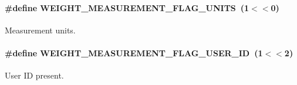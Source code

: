 \paragraph[{\texorpdfstring{W\+E\+I\+G\+H\+T\+\_\+\+M\+E\+A\+S\+U\+R\+E\+M\+E\+N\+T\+\_\+\+F\+L\+A\+G\+\_\+\+U\+N\+I\+TS}{WEIGHT_MEASUREMENT_FLAG_UNITS}}]{\setlength{\rightskip}{0pt plus 5cm}\#define W\+E\+I\+G\+H\+T\+\_\+\+M\+E\+A\+S\+U\+R\+E\+M\+E\+N\+T\+\_\+\+F\+L\+A\+G\+\_\+\+U\+N\+I\+TS~(1$<$$<$0)}\hypertarget{group___w_e_i_g_h_t___m_e_a_s_u_r_e_m_e_n_t___f_l_a_g_gad4a88d51214bde822176b70ce7429fc6}{}\label{group___w_e_i_g_h_t___m_e_a_s_u_r_e_m_e_n_t___f_l_a_g_gad4a88d51214bde822176b70ce7429fc6}
Measurement units. 
\paragraph[{\texorpdfstring{W\+E\+I\+G\+H\+T\+\_\+\+M\+E\+A\+S\+U\+R\+E\+M\+E\+N\+T\+\_\+\+F\+L\+A\+G\+\_\+\+U\+S\+E\+R\+\_\+\+ID}{WEIGHT_MEASUREMENT_FLAG_USER_ID}}]{\setlength{\rightskip}{0pt plus 5cm}\#define W\+E\+I\+G\+H\+T\+\_\+\+M\+E\+A\+S\+U\+R\+E\+M\+E\+N\+T\+\_\+\+F\+L\+A\+G\+\_\+\+U\+S\+E\+R\+\_\+\+ID~(1$<$$<$2)}\hypertarget{group___w_e_i_g_h_t___m_e_a_s_u_r_e_m_e_n_t___f_l_a_g_ga28c8f45a8945e87d144621449e2a8e86}{}\label{group___w_e_i_g_h_t___m_e_a_s_u_r_e_m_e_n_t___f_l_a_g_ga28c8f45a8945e87d144621449e2a8e86}
User ID present. 